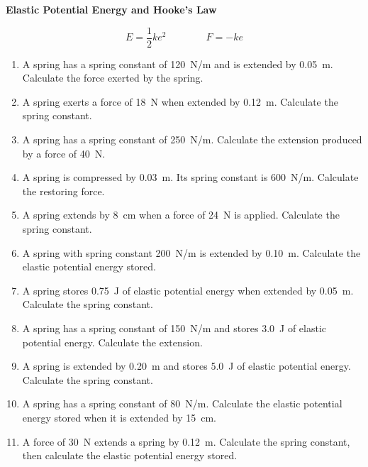 \documentclass[12pt,a4paper]{article}
\begin{document}
\begin{center}
    \Large \textbf{Elastic Potential Energy and Hooke's Law}
\end{center}

\[
E = \frac{1}{2}ke^2
\qquad\qquad
F = -ke
\]

\begin{enumerate}[label=\textbf{\arabic*.}]

\item A spring has a spring constant of \SI{120}{N/m} and is extended by \SI{0.05}{m}. Calculate the force exerted by the spring.

\item A spring exerts a force of \SI{18}{N} when extended by \SI{0.12}{m}. Calculate the spring constant.

\item A spring has a spring constant of \SI{250}{N/m}. Calculate the extension produced by a force of \SI{40}{N}.

\item A spring is compressed by \SI{0.03}{m}. Its spring constant is \SI{600}{N/m}. Calculate the restoring force.

\item A spring extends by \SI{8}{cm} when a force of \SI{24}{N} is applied. Calculate the spring constant.

\item A spring with spring constant \SI{200}{N/m} is extended by \SI{0.10}{m}. Calculate the elastic potential energy stored.

\item A spring stores \SI{0.75}{J} of elastic potential energy when extended by \SI{0.05}{m}. Calculate the spring constant.

\item A spring has a spring constant of \SI{150}{N/m} and stores \SI{3.0}{J} of elastic potential energy. Calculate the extension.

\item A spring is extended by \SI{0.20}{m} and stores \SI{5.0}{J} of elastic potential energy. Calculate the spring constant.

\item A spring has a spring constant of \SI{80}{N/m}. Calculate the elastic potential energy stored when it is extended by \SI{15}{cm}.

\item A force of \SI{30}{N} extends a spring by \SI{0.12}{m}. Calculate the spring constant, then calculate the elastic potential energy stored.


\end{enumerate}
\end{document}
